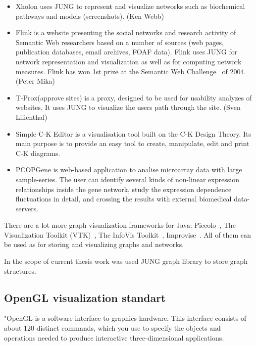 \documentclass[a4paper,oneside]{article}
\begin{document}
\begin{enumerate}
\begin{itemize}
\item Xholon uses JUNG to represent and visualize networks such as biochemical pathways and models (screenshots). (Ken Webb)~\cite{XHOLON}

\item Flink is a website presenting the social networks and research activity of Semantic Web researchers based on a number of sources (web pages, publication databases, email archives, FOAF data). Flink uses JUNG for network representation and visualization as well as for computing network measures. Flink has won 1st prize at the Semantic Web Challenge~\cite{SWC} of 2004. (Peter Mika)~\cite{FLINK}

\item T-Prox(approve sites) is a proxy, designed to be used for usability analyzes of websites. It uses JUNG to visualize the users path through the site. (Sven Lilienthal)~\cite{T_PROX}

\item Simple C-K Editor is a visualisation tool built on the C-K Design Theory. Its main purpose is to provide an easy tool to create, manipulate, edit and print C-K diagrams.~\cite{SIMPLE_C_K_EDITOR}

\item PCOPGene is web-based application to analise microarray data with large sample-series. The user can identify several kinds of non-linear expression relationships inside the gene network, study the expression dependence fluctuations in detail, and crossing the results with external biomedical data-servers.~\cite{PCOPGENE}

\end{itemize}

\end{enumerate}

There are a lot more graph visualization frameworks for Java: Piccolo~\cite{Piccolo}, The Visualization Toolkit (VTK)~\cite{VTK}, The InfoVis Toolkit~\cite{InfoVis_Toolkit}, Improvise~\cite{Improvise}. All of them can be used as for storing and visualizing graphs and networks. 


In the scope of current thesis work was used JUNG graph library to store graph structures.
	
\subsection{OpenGL visualization standart}
\label{opengl}
"OpenGL is a software interface to graphics hardware. This interface consists of about 120 distinct commands, which you use to specify the objects and operations needed to produce interactive three-dimensional applications.
\end{document}
